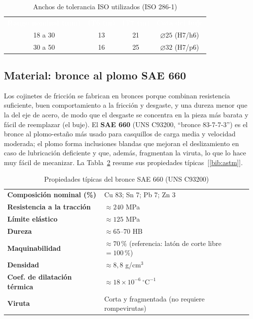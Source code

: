 \documentclass[12pt,a4paper]{article}
\newcommand{\encab}[1]{\textcolor{white}{\sffamily\bfseries #1}}
\newcommand{\refbib}[1]{[\ref{#1}]}
\begin{document}
\begin{table}[!htb]
	\centering
	\caption{Anchos de tolerancia ISO utilizados (ISO 286-1)}\label{tab:IT}
	\small
	\begin{tabular}{c c c c}
		\rowcolor{darkblue}
		\encab{Rango nominal (mm)} & \encab{IT6 (\textmu m)} & \encab{IT7 (\textmu m)} & \encab{Cota del buje}    \\
		18 a 30                    & 13                      & 21                      & $\varnothing 25$ (H7/h6) \\
		30 a 50                    & 16                      & 25                      & $\varnothing 32$ (H7/p6) \\
	\end{tabular}
\end{table}

\subsection{Material: bronce al plomo SAE 660}

Los cojinetes de fricción se fabrican en bronces porque combinan resistencia
suficiente, buen comportamiento a la fricción y desgaste, y una dureza menor que
la del eje de acero, de modo que el desgaste se concentra en la pieza más barata
y fácil de reemplazar (el buje). El \textbf{SAE 660} (UNS C93200, ``bronce
83-7-7-3'') es el bronce al plomo-estaño más usado para casquillos de carga
media y velocidad moderada; el plomo forma inclusiones blandas que mejoran el
deslizamiento en caso de lubricación deficiente y que, además, fragmentan la
viruta, lo que lo hace muy fácil de mecanizar. La Tabla~\ref{tab:material}
resume sus propiedades típicas~\refbib{bib:astm}.

\begin{table}[!htb]
	\centering
	\caption{Propiedades típicas del bronce SAE 660 (UNS
		C93200)}\label{tab:material}
	\small
	\begin{tabularx}{\linewidth}{>{\bfseries}l X}
		Composición nominal (\%)    & Cu 83; Sn 7; Pb 7; Zn 3                                        \\
		Resistencia a la tracción   & $\approx 240$ MPa                                              \\
		Límite elástico             & $\approx 125$ MPa                                              \\
		Dureza                      & $\approx 65$--$70$ HB                                          \\
		Maquinabilidad              & $\approx 70\,\%$ (referencia: latón de corte libre $=100\,\%$) \\
		Densidad                    & $\approx 8{,}8$ g/cm$^3$                                       \\
		Coef. de dilatación térmica & $\approx 18\times10^{-6}\ ^\circ\text{C}^{-1}$                 \\
		Viruta                      & Corta y fragmentada (no requiere rompevirutas)                 \\
	\end{tabularx}
\end{table}
\end{document}
